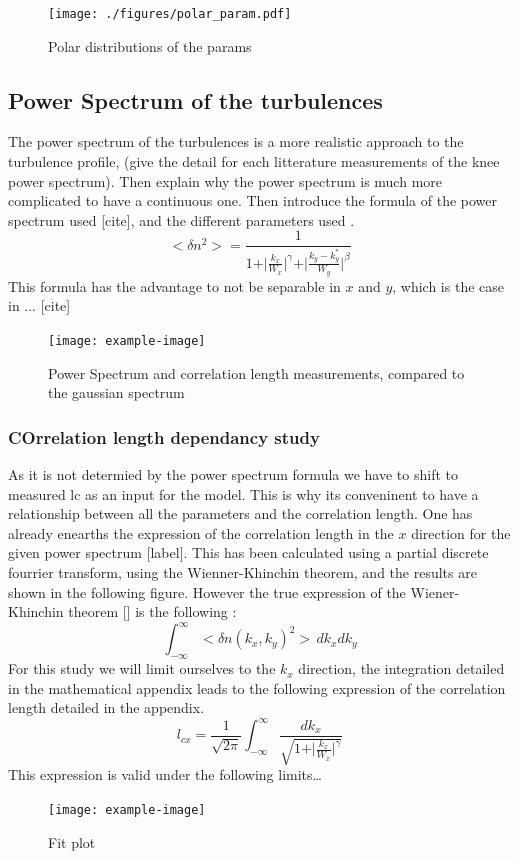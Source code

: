 \documentclass[11pt,a4paper]{report}
\begin{document}
\begin{figure}
    \centering
    \texttt{[image: ./figures/polar\_param.pdf]}
    \caption{Polar distributions of the params}
    \label{}
\end{figure}
\begin{multicols*}{2}
    \subsection{Power Spectrum of the turbulences}
    The power spectrum of the turbulences is a more realistic approach to the turbulence profile, (give the detail for each litterature measurements of the knee power spectrum). Then explain why the power spectrum is much more complicated to have a continuous one.
    Then introduce the formula of the power spectrum used [cite], and the different parameters used .
    $$<\delta n^2 > = \frac{1}{1 + \vert \frac{k_x}{W_x} \vert^\gamma + \vert \frac{k_y - k_y^*}{W_y}\vert^\beta}$$
    This formula has the advantage to not be separable in $x$ and $y$, which is the case in ... [cite]
    \begin{figure}[H]
        \centering
        \texttt{[image: example-image]}
        \caption{Power Spectrum and correlation length measurements, compared to the gaussian spectrum}
        \label{}
    \end{figure}

    \subsubsection{COrrelation length dependancy study}
    As it is not determied by the power spectrum formula we have to shift to measured lc as an input for the model. This is why its conveninent to have a relationship between all the parameters and the correlation length.
    One has already enearths the expression of the correlation length in the $x$ direction for the given power spectrum [label]. This has been calculated using a partial discrete fourrier transform, using the Wienner-Khinchin theorem, and the results are shown in the following figure.
    However the true expression of the Wiener-Khinchin theorem [] is the following :
    $$\int_{-\infty}^{\infty} <\delta n(k_x, k_y)^2> \, dk_xdk_y$$
    For this study we will limit ourselves to the $k_x$ direction, the integration detailed in the mathematical appendix leads to the following expression of the correlation length detailed in the appendix.
    $$l_{cx} = \frac{1}{\sqrt{2\pi}} \int_{-\infty}^{\infty} \frac{dk_x}{\sqrt{1 + \vert \frac{k_x}{W_x} \vert^\gamma}}$$
    This expression is valid under the following limits\dots

    \begin{figure}
        \centering
        \texttt{[image: example-image]}
        \caption{Fit plot}
        \label{}
    \end{figure}
\end{multicols*}
\end{document}
